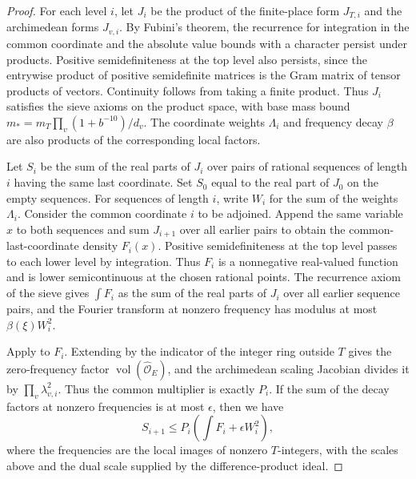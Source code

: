 \begin{proof}
For each level $i$, let $J_i$ be the product of the finite-place form $J_{T,i}$ and the archimedean forms $J_{v,i}$.
By Fubini's theorem, the recurrence for integration in the common coordinate and the absolute value bounds with a character persist under products.
Positive semidefiniteness at the top level also persists, since the entrywise product of positive semidefinite matrices is the Gram matrix of tensor products of vectors.
Continuity follows from taking a finite product. Thus $J_i$ satisfies the sieve axioms on the product space,
with base mass bound $m_*=m_T\prod_v(1+b^{-10})/d_v$.
The coordinate weights $\Lambda_i$ and frequency decay $\beta$ are also products of the corresponding local factors.

Let $S_i$ be the sum of the real parts of $J_i$ over pairs of rational sequences of length $i$ having the same last coordinate.
Set $S_0$ equal to the real part of $J_0$ on the empty sequences. For sequences of length $i$, write $W_i$ for the sum of the weights
$\Lambda_i$. Consider the common coordinate $i$ to be adjoined.
Append the same variable $x$ to both sequences and sum $J_{i+1}$ over all earlier pairs to obtain the common-last-coordinate density $F_i(x)$.
Positive semidefiniteness at the top level passes to each lower level by integration.
Thus $F_i$ is a nonnegative real-valued function and is lower semicontinuous at the chosen rational points.
The recurrence axiom of the sieve gives $\int F_i$ as the sum of the real parts of $J_i$ over all earlier sequence pairs,
and the Fourier transform at nonzero frequency has modulus at most $\beta(\xi)W_i^2$.

Apply  to $F_i$.
Extending by the indicator of the integer ring outside $T$ gives the zero-frequency factor
$\operatorname{vol}(\widehat{\mathcal O}_E)$,
and the archimedean scaling Jacobian divides it by $\prod_v\lambda_{v,i}^2$.
Thus the common multiplier is exactly $P_i$. If the sum of the decay factors at nonzero frequencies is at most $\epsilon$, then
we have
\[
 S_{i+1}\le P_i\left(\int F_i+\epsilon W_i^2\right),
\]
where the frequencies are the local images of nonzero $T$-integers, with the scales above and the dual scale supplied by the difference-product ideal.


\end{proof}
